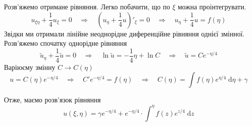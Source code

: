 Розв'яжемо отримане рівняння. Легко побачити, що по $\xi$ можна проінтегрувати. 
\begin{equation*}
    u_{\xi\eta} + \frac{1}{4}u_\xi = 0
    \quad\Rightarrow\quad
    \left(u_\eta + \frac{1}{4}u\right)'_\xi = 0
    \quad\Rightarrow\quad
    u_\eta + \frac{1}{4}u = f(\eta)
\end{equation*}
Звідки ми отримали лінійне неоднорідне диференційне рівняння однієї змінної. Розв'яжемо спочатку однорідне рівняння
\begin{equation*}
    \tilde{u}_\eta + \frac{1}{4}\tilde{u} = 0
    \quad\Rightarrow\quad
    \ln\tilde{u} = -\frac{1}{4}\eta + \ln C 
    \quad\Rightarrow\quad
    \tilde{u} = Ce^{-\eta/4} 
\end{equation*}
Варіюєму змінну $C \to C(\eta)$
\begin{equation*}
    u = C(\eta)e^{-\eta/4} 
    \quad\Rightarrow\quad
    C'e^{-\eta/4} = f(\eta)
    \quad\Rightarrow\quad
    C(\eta) = \int f(\eta) e^{\eta/4} \;\mathrm{d}\eta + \gamma
\end{equation*}

Отже, маємо розв'язок рівняння
\begin{equation}
    u(\xi,\eta) = \gamma e^{-\eta/4} + e^{-\eta/4} \cdot \int^\eta f(z) e^{z/4} \;\mathrm{d}z
\end{equation} 


%